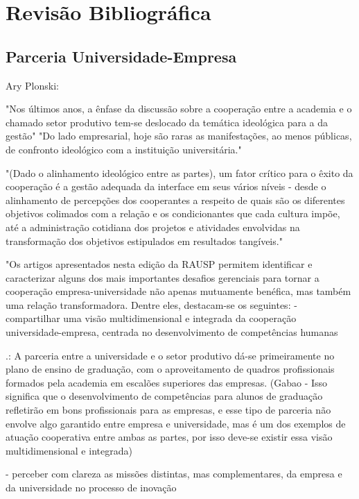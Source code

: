 \chapter[Revisão Bibliográfica]{Revisão Bibliográfica}
\label{chap:revisao}

\section{Parceria Universidade-Empresa}
\label{cha:ensino}

Ary Plonski:

"Nos últimos anos, a ênfase da discussão sobre a cooperação entre a academia e o chamado setor produtivo tem-se deslocado da temática ideológica para a da gestão"
"Do lado empresarial, hoje são raras as manifestações, ao menos públicas, de confronto ideológico com a instituição universitária."

"(Dado o alinhamento ideológico entre as partes), um fator crítico para o êxito da cooperação é a gestão adequada da interface em seus vários níveis - desde o alinhamento de percepções dos cooperantes a respeito de quais são os diferentes objetivos colimados com a relação e os condicionantes que cada cultura impõe, até a administração cotidiana dos projetos e atividades envolvidas na transformação dos objetivos estipulados em resultados tangíveis."

"Os artigos apresentados nesta edição da RAUSP permitem identificar e caracterizar alguns dos mais importantes desafios gerenciais para tornar a cooperação empresa-universidade não apenas mutuamente benéfica, mas também uma relação transformadora. Dentre eles, destacam-se os seguintes: 
- compartilhar uma visão multidimensional e integrada da cooperação universidade-empresa, centrada no desenvolvimento de competências humanas

.: A parceria entre a universidade e o setor produtivo dá-se primeiramente no plano de ensino de graduação, com o aproveitamento de quadros profissionais formados pela academia em escalões superiores das empresas. (Gabao - Isso significa que o desenvolvimento de competências para alunos de graduação refletirão em bons profissionais para as empresas, e esse tipo de parceria não envolve algo garantido entre empresa e universidade, mas é um dos exemplos de atuação cooperativa entre ambas as partes, por isso deve-se existir essa visão multidimensional e integrada)

- perceber com clareza as missões distintas, mas complementares, da empresa e da universidade no processo de inovação

